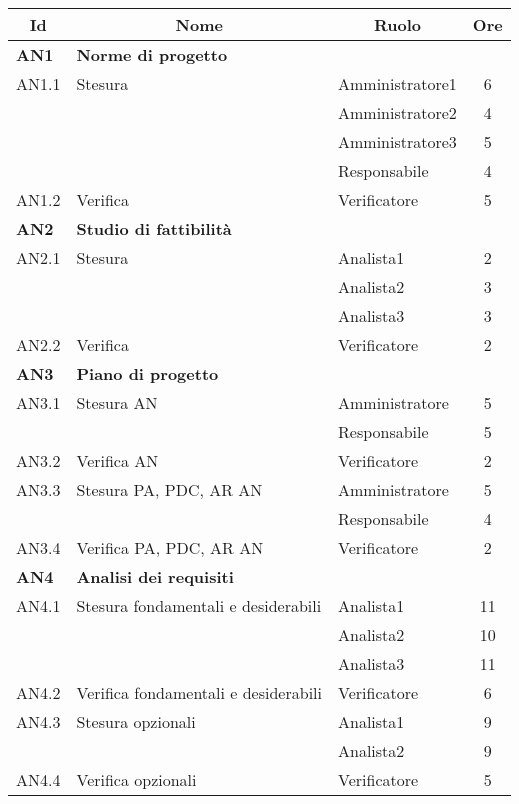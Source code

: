 \begin{table}[H]
	\centering
	\begin{tabular}{ l l l c  }
	\hline
	\multicolumn{1}{c}{\textbf{Id}} & 
	\multicolumn{1}{c}{\textbf{Nome}} & 
	\multicolumn{1}{c}{\textbf{Ruolo}}& 
	\multicolumn{1}{c}{\textbf{Ore}} \\
	\hline
	
	\textbf{AN1} & \textbf{Norme di progetto} \\
	\cline{3-4}
	AN1.1 & Stesura & Amministratore1 & 6\\ 
    & & Amministratore2 & 4\\
    & & Amministratore3 & 5 \\
    & & Responsabile & 4 \\
    \cline{3-4}
	AN1.2 & Verifica & Verificatore &  5\\
	
	\hline
	\textbf{AN2} & \textbf{Studio di fattibilità} \\
	\cline{3-4}
	AN2.1 & Stesura & Analista1 & 2\\ 
    & & Analista2 & 3\\
    & & Analista3 & 3 \\
    \cline{3-4}
	AN2.2 & Verifica & Verificatore &  2\\
	
	\hline
	\textbf{AN3} & \textbf{Piano di progetto} \\
	\cline{3-4}
	AN3.1 & Stesura AN & Amministratore & 5\\ 
    & & Responsabile & 5\\
    \cline{3-4}
	AN3.2 & Verifica AN & Verificatore &  2\\
	\cline{3-4}
	AN3.3 & Stesura PA, PDC, AR AN & Amministratore & 5\\ 
    & & Responsabile & 4\\
	\cline{3-4}
	AN3.4 & Verifica PA, PDC, AR AN & Verificatore &  2\\
	
	\hline
	\textbf{AN4} & \textbf{Analisi dei requisiti} \\
	\cline{3-4}
	AN4.1 & Stesura fondamentali e desiderabili & Analista1 & 11\\ 
    & & Analista2 & 10\\
    & & Analista3 & 11\\
    \cline{3-4}
	AN4.2 & Verifica fondamentali e desiderabili & Verificatore &  6\\
	\cline{3-4}
	AN4.3 & Stesura opzionali & Analista1 & 9\\ 
    & & Analista2 & 9\\
	\cline{3-4}
	AN4.4 & Verifica opzionali & Verificatore &  5\\
	

\end{tabular}
\end{table}

